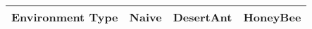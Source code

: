 \begin{tabular} {|l|l|l|l|}
\hline
Environment Type & Naive & DesertAnt & HoneyBee \\
\hline
\hline
\end{tabular}
